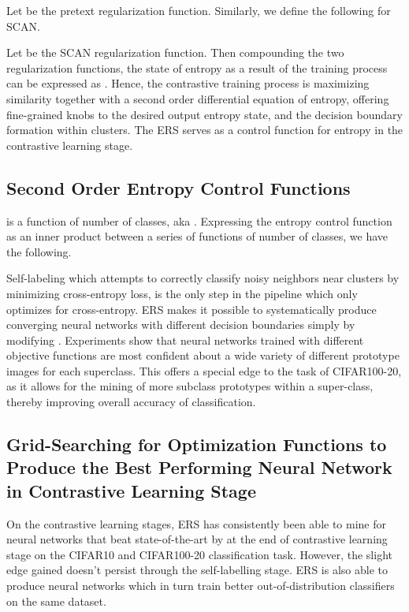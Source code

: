\documentclass[10pt,twocolumn,letterpaper]{article}
\begin{document}
Let  be the pretext regularization function. Similarly, we define the following for SCAN. 



Let  be the SCAN regularization function. Then compounding the two regularization functions, the state of entropy as a result of the training process can be expressed as . Hence, the contrastive training process is maximizing similarity together with a second order differential equation of entropy, offering fine-grained knobs to the desired output entropy state, and the decision boundary formation within clusters. The ERS serves as a control function for entropy in the contrastive learning stage. 
\subsection{Second Order Entropy Control Functions}

 is a function of number of classes, aka . Expressing the entropy control function as an inner product between a series of functions of number of classes, we have the following. 



Self-labeling which attempts to correctly classify noisy neighbors near clusters by minimizing cross-entropy loss, is the only step in the pipeline which only optimizes for cross-entropy. ERS makes it possible to systematically produce converging neural networks with different decision boundaries simply by modifying . Experiments show that neural networks trained with different objective functions are most confident about a wide variety of different prototype images for each superclass. This offers a special edge to the task of CIFAR100-20, as it allows for the mining of more subclass prototypes within a super-class, thereby improving overall accuracy of classification.

\subsection{Grid-Searching for Optimization Functions to Produce the Best Performing Neural Network in Contrastive Learning Stage}
On the contrastive learning stages, ERS has consistently been able to mine for neural networks that beat state-of-the-art by  at the end of contrastive learning stage on the CIFAR10 and CIFAR100-20 classification task. However, the slight edge gained doesn't persist through the self-labelling stage. ERS is also able to produce neural networks which in turn train better out-of-distribution classifiers on the same dataset. 
\end{document}
